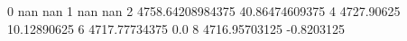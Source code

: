 0 nan nan
1 nan nan
2 4758.64208984375 40.86474609375
4 4727.90625 10.12890625
6 4717.77734375 0.0
8 4716.95703125 -0.8203125
